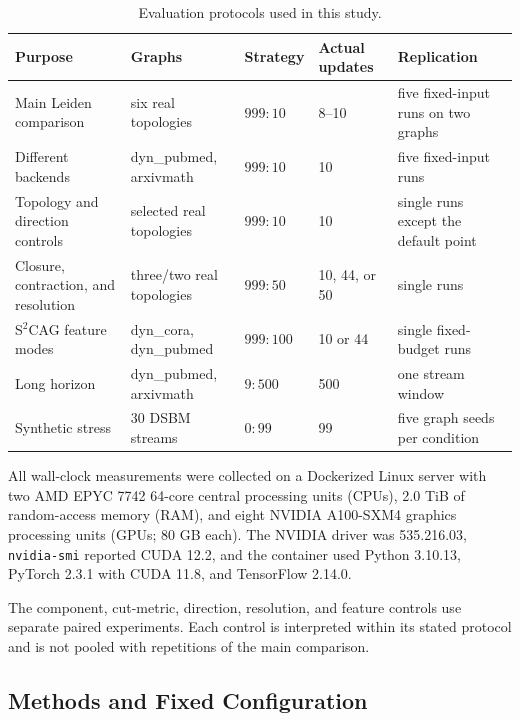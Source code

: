 \documentclass{ieeeaccess}
\begin{document}
\begin{table}[t]
\centering
\caption{Evaluation protocols used in this study.}
\label{tab:protocols}
\setlength{\tabcolsep}{4.0pt}
\small
\begin{tabular}{@{}lllll@{}}
\toprule
\textbf{Purpose} & \textbf{Graphs} & \textbf{Strategy} &
\textbf{Actual updates} & \textbf{Replication} \\
\midrule
Main Leiden comparison & six real topologies & $999{:}10$ & 8--10 & five fixed-input runs on two graphs \\
Different backends & dyn\_pubmed, arxivmath & $999{:}10$ & 10 & five fixed-input runs \\
Topology and direction controls & selected real topologies & $999{:}10$ & 10 & single runs except the default point \\
Closure, contraction, and resolution & three/two real topologies & $999{:}50$ & 10, 44, or 50 & single runs \\
S$^2$CAG feature modes & dyn\_cora, dyn\_pubmed & $999{:}100$ & 10 or 44 & single fixed-budget runs \\
Long horizon & dyn\_pubmed, arxivmath & $9{:}500$ & 500 & one stream window \\
Synthetic stress & 30 DSBM streams & $0{:}99$ & 99 & five graph seeds per condition \\
\bottomrule
\end{tabular}
\end{table}

All wall-clock measurements were collected on a Dockerized Linux server with
two AMD EPYC 7742 64-core central processing units (CPUs), 2.0 TiB of
random-access memory (RAM), and eight NVIDIA A100-SXM4 graphics processing
units (GPUs; 80 GB each). The NVIDIA driver was 535.216.03,
\texttt{nvidia-smi} reported
CUDA 12.2, and the container used Python 3.10.13, PyTorch 2.3.1 with CUDA 11.8,
and TensorFlow 2.14.0.

The component, cut-metric, direction, resolution, and feature controls use
separate paired experiments. Each control is interpreted within its stated
protocol and is not pooled with repetitions of the main comparison.

\subsection{Methods and Fixed Configuration}
\end{document}
